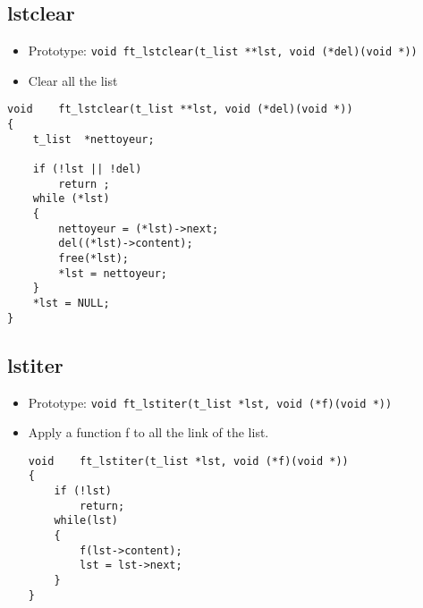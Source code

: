 \documentclass{article}
\begin{document}
		\subsection{lstclear}
			\begin{itemize}[label=$\rightarrow$]
				\item Prototype: \texttt{void    ft\_lstclear(t\_list **lst, void (*del)(void *)) }
				\item Clear all the list
			\end{itemize}
			\begin{verbatim}
void    ft_lstclear(t_list **lst, void (*del)(void *))                          
{                                                                               
    t_list  *nettoyeur;                                                         
                                                                                
    if (!lst || !del)                                                           
        return ;                                                                
    while (*lst)                                                                
    {                                                                           
        nettoyeur = (*lst)->next;                                               
        del((*lst)->content);                                                   
        free(*lst);                                                             
        *lst = nettoyeur;                                                       
    }                                                                           
    *lst = NULL;                                                                
}  
			\end{verbatim}
		
		\subsection{lstiter}
			\begin{itemize}[label=$\rightarrow$]
				\item Prototype: \texttt{void    ft\_lstiter(t\_list *lst, void (*f)(void *)) }
				\item Apply a function f to all the link of the list.
				\begin{verbatim}
void    ft_lstiter(t_list *lst, void (*f)(void *))                              
{                                                                               
    if (!lst)                                                                   
        return;                                                                 
    while(lst)                                                                  
    {                                                                           
        f(lst->content);                                                        
        lst = lst->next;                                                        
    }                                                                           
}
				\end{verbatim}
			\end{itemize}
		
\end{document}
